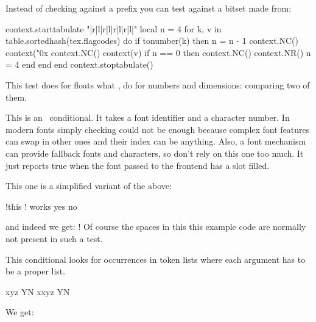 Instead of checking against a prefix you can test against a bitset made from:

\startluacode
context.starttabulate { "|r|l|r|l|r|l|r|l|" }
local n = 4
for k, v in table.sortedhash(tex.flagcodes) do
    if tonumber(k) then
        n = n - 1
        context.NC() context("0x%
        context.NC() context(v)
        if n == 0 then
            context.NC()
            context.NR()
            n = 4
        end
    end
end
context.stoptabulate()
\stopluacode

\stopnewprimitive

\startnewprimitive[title={\prm {iffloat}}]

This test does for floats what ,  do for numbers and
dimensions: comparing two of them.

\stopnewprimitive

\startoldprimitive[title={\prm {iffontchar}}]

This is an \ETEX\ conditional. It takes a font identifier and a character number.
In modern fonts simply checking could not be enough because complex font features
can swap in other ones and their index can be anything. Also, a font mechanism
can provide fallback fonts and characters, so don't rely on this one too much. It
just reports true when the font passed to the frontend has a slot filled.

\stopoldprimitive

\startnewprimitive[title={\prm {ifhaschar}}]

This one is a simplified variant of the above:

\startbuffer
\ifhaschar !{this ! works} yes \else no \fi
\stopbuffer

\typebuffer

and indeed we get: \inlinebuffer ! Of course the spaces in this this example
code are normally not present in such a test.

\stopnewprimitive

\startnewprimitive[title={\prm {ifhastok}}]

This conditional looks for occurrences in token lists where each argument has to
be a proper list.

\startbuffer
\def\scratchtoks{x}

         {xyz} Y\else N\fi\quad
\ifhastoks\scratchtoks {xyz} Y\else N\fi
\stopbuffer

\typebuffer

We get:

{\getbuffer}

